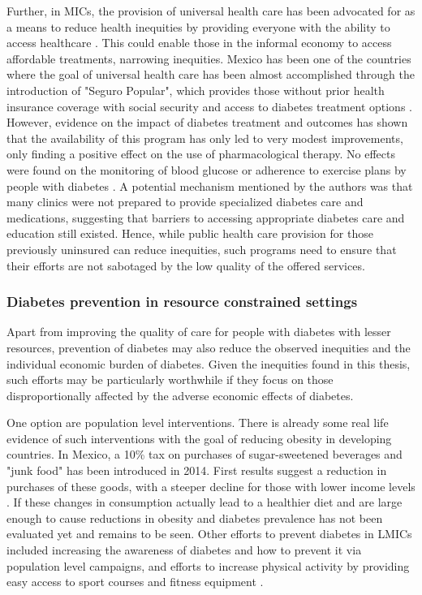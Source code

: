 Further, in \acp{MIC}, the provision of universal health care has been advocated for as a means to reduce health inequities by providing everyone with the ability to access healthcare \parencite{Marmot2008}. This could enable those in the informal economy to access affordable treatments, narrowing inequities.  Mexico has been one of the countries where the goal of universal health care has been almost accomplished through the introduction of "Seguro Popular", which provides those without prior health insurance coverage with social security and access to diabetes treatment options \parencite{Knaul2012,Rivera-Hernandez2016}. However, evidence on the impact of diabetes treatment and outcomes has shown that the availability of this program has only led to very modest improvements, only finding a positive effect on the use of pharmacological therapy. No effects were found on the monitoring of blood glucose or adherence to exercise plans by people with diabetes \parencite{Rivera-Hernandez2016}. A potential mechanism mentioned by the authors was that many clinics were not prepared to provide specialized diabetes care and medications, suggesting that barriers to accessing appropriate diabetes care and education still existed. Hence, while public health care provision for those previously uninsured can reduce inequities, such programs need to ensure that their efforts are not sabotaged by the low quality of the offered services.

\subsubsection*{Diabetes prevention in resource constrained settings}

Apart from improving the quality of care for people with diabetes with lesser resources, prevention of diabetes may also reduce the observed inequities and the individual economic burden of diabetes. Given the inequities found in this thesis, such efforts may be particularly worthwhile if they focus on those disproportionally affected by the adverse economic effects of diabetes.

One option are population level interventions. There is already some real life evidence of such interventions with the goal of reducing obesity in developing countries. In Mexico, a 10\% tax on purchases of sugar-sweetened beverages and "junk food" has been introduced in 2014. First results suggest a reduction in purchases of these goods, with a steeper decline for those with lower income levels \parencite{Colchero2016,Batis2016}. If these changes in consumption actually lead to a healthier diet and are large enough to cause reductions in obesity and diabetes prevalence has not been evaluated yet and remains to be seen. Other efforts to prevent diabetes in \acp{LMIC} included increasing the awareness of diabetes and how to prevent it via population level campaigns, and efforts to increase physical activity by providing easy access to sport courses and fitness equipment \textcite{Cefalu2016}. 

